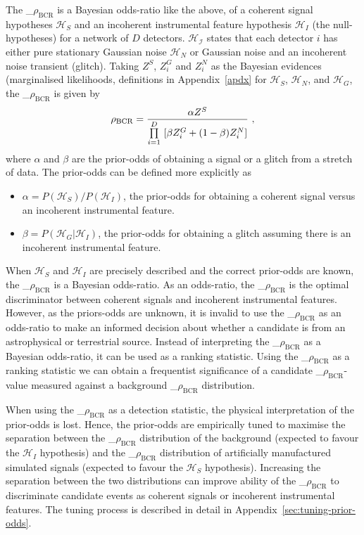 \documentclass[%
 nofootinbib,
 amsmath,amssymb,
 aps,
 twocolumn
]{revtex4-2}
\newcommand{\mathcmd}[1]{{\sc \relax\ifmmode#1\else $#1$\fi}\xspace}
\newcommand{\bcr}{\mathcmd{\rho_\text{BCR}}}
\begin{document}
The \bcr is a Bayesian odds-ratio like the above, of a coherent signal hypotheses $\mathcal{H}_S$ and an incoherent instrumental feature hypothesis $\mathcal{H}_I$ (the null-hypotheses) for a network of $D$ detectors. $\mathcal{H_I}$ states that each detector $i$ has either pure stationary Gaussian noise $\mathcal{H}_N$ or Gaussian noise and an incoherent noise transient (glitch). Taking $Z^S$, $Z^G_i$ and $Z^N_i$ as the Bayesian evidences (marginalised likelihoods, definitions in Appendix~\ref{apdx} for $\mathcal{H}_S$, $\mathcal{H}_N$, and $\mathcal{H}_G$, the \bcr is given by
\begin{equation}
\label{eq:bcr}
\bcr = \frac{\alpha Z^S}{\prod\limits^D_{i=1} \ [\beta Z^G_i + (1-\beta)Z^N_i]}\ ,
\end{equation}
where $\alpha$ and $\beta$ are the prior-odds of obtaining a signal or a glitch from a stretch of data. The prior-odds can be defined more explicitly as 
\begin{itemize}
    \item $\alpha=P(\mathcal{H}_S)/P(\mathcal{H}_I)$, the prior-odds for obtaining a coherent signal versus an incoherent instrumental feature.
    \item $\beta=P(\mathcal{H}_G| \mathcal{H}_I)$, the prior-odds for obtaining a glitch assuming there is an incoherent instrumental feature.
\end{itemize}

When $\mathcal{H}_S$ and $\mathcal{H}_I$ are precisely described and the correct prior-odds are known, the \bcr is a Bayesian odds-ratio. As an odds-ratio, the \bcr is the optimal discriminator between coherent signals and incoherent instrumental features. However, as the priors-odds are unknown, it is invalid to use the \bcr as an odds-ratio to make an informed decision about whether a candidate is from an astrophysical or terrestrial source. Instead of interpreting the \bcr as a Bayesian odds-ratio, it can be used as a ranking statistic. Using the \bcr as a ranking statistic we can obtain a frequentist significance of a candidate \bcr-value measured against a background \bcr distribution. 

When using the \bcr as a detection statistic, the physical interpretation of the prior-odds is lost. Hence, the prior-odds are empirically tuned to maximise the separation between the \bcr distribution of the background (expected to favour the $\mathcal{H}_I$ hypothesis) and the \bcr distribution of artificially manufactured simulated signals (expected to favour the $\mathcal{H}_S$ hypothesis). Increasing the separation between the two distributions can improve ability of the \bcr to discriminate candidate events as coherent signals or incoherent instrumental features. The tuning process is described in detail in Appendix~\ref{sec:tuning-prior-odds}. 
\end{document}
